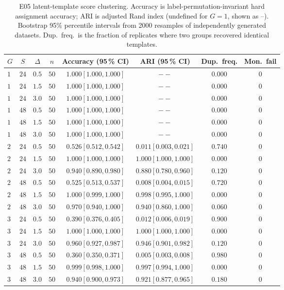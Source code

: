 \begin{table}[!htbp]
\centering
\small
\caption{E05 latent-template score clustering. Accuracy is label-permutation-invariant hard assignment accuracy; ARI is adjusted Rand index (undefined for $G=1$, shown as --). Bootstrap 95\% percentile intervals from 2000 resamples of independently generated datasets. Dup.\ freq.\ is the fraction of replicates where two groups recovered identical templates.}
\label{tab:E05-latent}
\begin{tabular}{@{}lccccccc@{}}
\toprule
$G$ & $S$ & $\Delta$ & $n$ & Accuracy (95\,\% CI) & ARI (95\,\% CI) & Dup.\ freq. & Mon.\ fail \\
\midrule
$1$ & $24$ & $0.5$ & $50$ & $1.000 [1.000,1.000]$ & $--$ & $0.000$ & $0$ \\
$1$ & $24$ & $1.5$ & $50$ & $1.000 [1.000,1.000]$ & $--$ & $0.000$ & $0$ \\
$1$ & $24$ & $3.0$ & $50$ & $1.000 [1.000,1.000]$ & $--$ & $0.000$ & $0$ \\
$1$ & $48$ & $0.5$ & $50$ & $1.000 [1.000,1.000]$ & $--$ & $0.000$ & $0$ \\
$1$ & $48$ & $1.5$ & $50$ & $1.000 [1.000,1.000]$ & $--$ & $0.000$ & $0$ \\
$1$ & $48$ & $3.0$ & $50$ & $1.000 [1.000,1.000]$ & $--$ & $0.000$ & $0$ \\
$2$ & $24$ & $0.5$ & $50$ & $0.526 [0.512,0.542]$ & $0.011 [0.003,0.021]$ & $0.740$ & $0$ \\
$2$ & $24$ & $1.5$ & $50$ & $1.000 [1.000,1.000]$ & $1.000 [1.000,1.000]$ & $0.000$ & $0$ \\
$2$ & $24$ & $3.0$ & $50$ & $0.940 [0.890,0.980]$ & $0.880 [0.780,0.960]$ & $0.120$ & $0$ \\
$2$ & $48$ & $0.5$ & $50$ & $0.525 [0.513,0.537]$ & $0.008 [0.004,0.015]$ & $0.720$ & $0$ \\
$2$ & $48$ & $1.5$ & $50$ & $1.000 [0.999,1.000]$ & $0.998 [0.995,1.000]$ & $0.000$ & $0$ \\
$2$ & $48$ & $3.0$ & $50$ & $0.970 [0.940,1.000]$ & $0.940 [0.860,1.000]$ & $0.060$ & $0$ \\
$3$ & $24$ & $0.5$ & $50$ & $0.390 [0.376,0.405]$ & $0.012 [0.006,0.019]$ & $0.900$ & $0$ \\
$3$ & $24$ & $1.5$ & $50$ & $1.000 [1.000,1.000]$ & $1.000 [1.000,1.000]$ & $0.000$ & $0$ \\
$3$ & $24$ & $3.0$ & $50$ & $0.960 [0.927,0.987]$ & $0.946 [0.901,0.982]$ & $0.120$ & $0$ \\
$3$ & $48$ & $0.5$ & $50$ & $0.360 [0.350,0.371]$ & $0.005 [0.003,0.008]$ & $0.980$ & $0$ \\
$3$ & $48$ & $1.5$ & $50$ & $0.999 [0.998,1.000]$ & $0.997 [0.994,1.000]$ & $0.000$ & $0$ \\
$3$ & $48$ & $3.0$ & $50$ & $0.940 [0.900,0.973]$ & $0.921 [0.877,0.965]$ & $0.180$ & $0$ \\
\bottomrule
\end{tabular}
\end{table}
